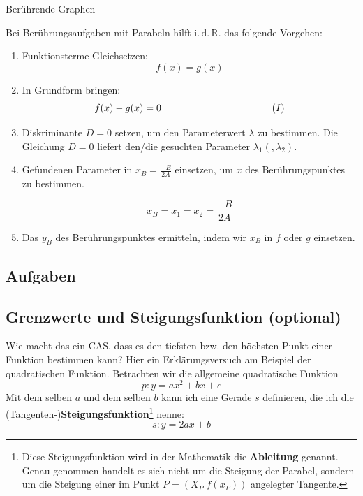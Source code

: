 \begin{rezept}{Berührende Graphen}{}

  Bei Berührungsaufgaben mit Parabeln hilft i.\,d.\,R. das folgende
  Vorgehen:

  \begin{enumerate}
  \item Funktionsterme Gleichsetzen: $$f(x) = g(x)$$
  \item In Grundform bringen: $$f(x) - g(x) = 0  \hspace{40mm}
    (I)$$
  \item Diskriminante $D = 0 $ setzen, um den Parameterwert $\lambda$ zu
    bestimmen. Die Gleichung $D=0$ liefert den/die gesuchten Parameter $\lambda_1(, \lambda_2)$.
    
  \item Gefundenen Parameter in $x_B=\frac{-B}{2A}$ einsetzen, um $x$
    des Berührungspunktes zu bestimmen.
    
    $$x_B=x_1=x_2= \frac{-B}{2A}$$

  \item Das $y_B$ des Berührungspunktes ermitteln, indem wir $x_B$ in
    $f$ oder $g$ einsetzen.
    \end{enumerate}
\end{rezept}


\subsection{Aufgaben}
\newpage


\subsection{Grenzwerte und Steigungsfunktion (optional)}

Wie macht das ein CAS, dass es den tiefsten bzw. den höchsten Punkt
einer Funktion bestimmen kann? Hier ein Erklärungsversuch am Beispiel
der quadratischen Funktion.
Betrachten wir die allgemeine quadratische Funktion $$p: y=ax^2 + bx +
c$$
Mit dem selben $a$ und dem selben $b$ kann ich eine Gerade $s$
definieren, die ich die (Tangenten-)\textbf{Steigungsfunktion}\footnote{Diese
  Steigungsfunktion wird in der Mathematik die
  \textbf{Ableitung} genannt. Genau genommen handelt
  es sich nicht um die Steigung der Parabel, sondern um die Steigung
  einer im Punkt $P=(X_P|f(x_P))$ angelegter Tangente.} nenne:
$$s: y= 2ax+b$$
\newpage


